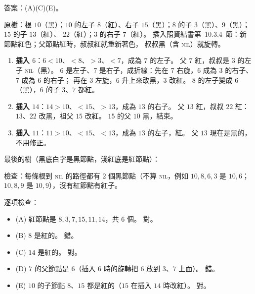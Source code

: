 \begin{pastsoln}
答案：(A)(C)(E)。

原樹：根 $10$（黑）；$10$ 的左子 $8$（紅）、右子 $15$（黑）；$8$ 的子 $3$（黑）、$9$（黑）；$15$ 的子 $13$（紅）、
$22$（紅）；$3$ 的右子 $7$（紅）。 插入照資結書第~10.3.4~節：新節點紅色；父節點紅時，叔叔紅就重新著色，
叔叔黑（含 \textsc{nil}）就旋轉。

\begin{enumerate}
\item \textbf{插入 $6$}：$6 < 10$、$< 8$、$> 3$、$< 7$，成為 $7$ 的左子。 父 $7$ 紅，叔叔是 $3$ 的左子
\textsc{nil}（黑）。 $6$ 是左子、$7$ 是右子，成折線：先在 $7$ 右旋，$6$ 成為 $3$ 的右子、$7$ 成為 $6$ 的右子；
再在 $3$ 左旋，$6$ 升上來改黑，$3$ 改紅。 $8$ 的左子變成 $6$（黑），$6$ 的子 $3$、$7$ 都紅。
\item \textbf{插入 $14$}：$14 > 10$、$< 15$、$> 13$，成為 $13$ 的右子。 父 $13$ 紅，叔叔 $22$ 紅：$13$、$22$
改黑，祖父 $15$ 改紅。 $15$ 的父 $10$ 黑，結束。
\item \textbf{插入 $11$}：$11 > 10$、$< 15$、$< 13$，成為 $13$ 的左子，紅。 父 $13$ 現在是黑的，不用修正。
\end{enumerate}
最後的樹（黑底白字是黑節點，淺紅底是紅節點）：
\begin{center}
\end{center}
檢查：每條根到 \textsc{nil} 的路徑都有 $2$ 個黑節點（不算 \textsc{nil}，例如 $10, 8, 6, 3$ 是 $10, 6$；
$10, 8, 9$ 是 $10, 9$），沒有紅節點有紅子。

逐項檢查：
\begin{itemize}
\item (A) 紅節點是 $8, 3, 7, 15, 11, 14$，共 $6$ 個。 對。
\item (B) $8$ 是紅的。 錯。
\item (C) $14$ 是紅的。 對。
\item (D) $7$ 的父節點是 $6$（插入 $6$ 時的旋轉把 $6$ 放到 $3$、$7$ 上面）。 錯。
\item (E) $10$ 的子節點 $8$、$15$ 都是紅的（$15$ 在插入 $14$ 時改紅）。 對。
\end{itemize}
\end{pastsoln}
